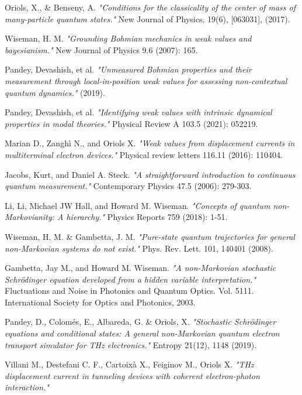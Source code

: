 \documentclass[11pt, a4paper]{article} %
\begin{document}
\begin{thebibliography}{1}
{
Oriols, X., \& Benseny, A. {\em "Conditions for the classicality of the center of mass of many-particle quantum states."} New Journal of Physics, 19(6), [063031],  (2017).

Wiseman, H. M. {\em "Grounding Bohmian mechanics in weak values and bayesianism."} New Journal of Physics 9.6 (2007): 165.

Pandey, Devashish, et al. {\em "Unmeasured Bohmian properties and their measurement through local-in-position weak values for assessing non-contextual quantum dynamics."} (2019).

Pandey, Devashish, et al. {\em "Identifying weak values with intrinsic dynamical properties in modal theories."} Physical Review A 103.5 (2021): 052219.

Marian D., Zanghì N., and Oriols X. {\em "Weak values from displacement currents in multiterminal electron devices."} Physical review letters 116.11 (2016): 110404.

Jacobs, Kurt, and Daniel A. Steck. {\em "A straightforward introduction to continuous quantum measurement."} Contemporary Physics 47.5 (2006): 279-303.

Li, Li, Michael JW Hall, and Howard M. Wiseman. {\em "Concepts of quantum non-Markovianity: A hierarchy."} Physics Reports 759 (2018): 1-51.

Wiseman, H. M. \& Gambetta, J. M. {\em "Pure-state quantum trajectories for general non-Markovian systems do not exist."} Phys. Rev. Lett. 101, 140401 (2008).

Gambetta, Jay M., and Howard M. Wiseman. {\em "A non-Markovian stochastic Schrödinger equation developed from a hidden variable interpretation."} Fluctuations and Noise in Photonics and Quantum Optics. Vol. 5111. International Society for Optics and Photonics, 2003.

Pandey, D., Colomés, E., Albareda, G. \& Oriols, X. {\em "Stochastic Schrödinger equations and conditional states: A general non-Markovian quantum electron transport simulator for THz electronics."} Entropy 21(12), 1148 (2019).

Villani M., Destefani C. F., Cartoixà X., Feiginov M., Oriols X. {\em "THz displacement current in tunneling devices with coherent electron-photon
interaction."}

}

\end{thebibliography}
\end{document}
